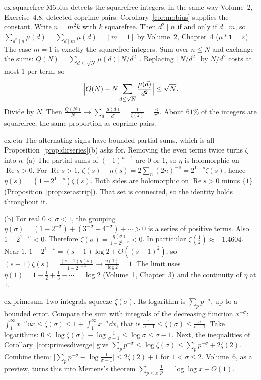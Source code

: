\begin{solution}{ex:squarefree}
\idea Möbius detects the squarefree integers, in the same way Volume~2, Exercise~4.8, detected coprime pairs. Corollary~\ref{cor:mobius} supplies the constant.
\writeup Write $n=m^2k$ with $k$ squarefree. Then $d^2\mid n$ if and only if $d\mid m$, so $\sum_{d^2\mid n}\mu(d)=\sum_{d\mid m}\mu(d)=[m=1]$ by Volume~2, Chapter~4 ($\mu*\mathbf 1=\varepsilon$). The case $m=1$ is exactly the squarefree integers.
Sum over $n\le N$ and exchange the sums: $Q(N)=\sum_{d\le\sqrt N}\mu(d)\lfloor N/d^2\rfloor$. Replacing $\lfloor N/d^2\rfloor$ by $N/d^2$ costs at most $1$ per term, so
\[
\Bigl|Q(N)-N\sum_{d\le\sqrt N}\frac{\mu(d)}{d^2}\Bigr|\le\sqrt N.
\]
Divide by $N$. Then $\frac{Q(N)}N\to\sum_d\frac{\mu(d)}{d^2}=\frac1{\zeta(2)}=\frac6{\pi^2}$. About $61\%$ of the integers are squarefree, the same proportion as coprime pairs.
\end{solution}

\begin{solution}{ex:eta}
\idea The alternating signs have bounded partial sums, which is all Proposition~\ref{prop:dirseries}(b) asks for. Removing the even terms twice turns $\zeta$ into $\eta$.
\writeup (a) The partial sums of $(-1)^{n-1}$ are $0$ or $1$, so $\eta$ is holomorphic on $\operatorname{Re}s>0$. For $\operatorname{Re}s>1$, $\zeta(s)-\eta(s)=2\sum_n(2n)^{-s}=2^{1-s}\zeta(s)$, hence $\eta(s)=(1-2^{1-s})\zeta(s)$. Both sides are holomorphic on $\operatorname{Re}s>0$ minus $\{1\}$ (Proposition~\ref{prop:zetastrip}). That set is connected, so the identity holds throughout it.

(b) For real $0<\sigma<1$, the grouping $\eta(\sigma)=(1-2^{-\sigma})+(3^{-\sigma}-4^{-\sigma})+\cdots>0$ is a series of positive terms. Also $1-2^{1-\sigma}<0$. Therefore $\zeta(\sigma)=\frac{\eta(\sigma)}{1-2^{1-\sigma}}<0$. In particular $\zeta(\frac12)\approx-1.4604$. Near $1$, $1-2^{1-s}=(s-1)\log2+O((s-1)^2)$, so $(s-1)\zeta(s)=\frac{(s-1)\eta(s)}{1-2^{1-s}}\to\frac{\eta(1)}{\log2}=1$. The limit uses $\eta(1)=1-\frac12+\frac13-\cdots=\log2$ (Volume~1, Chapter~3) and the continuity of $\eta$ at $1$.
\end{solution}

\begin{solution}{ex:primesum}
\idea Two integrals squeeze $\zeta(\sigma)$. Its logarithm is $\sum_pp^{-\sigma}$, up to a bounded error.
\writeup Compare the sum with integrals of the decreasing function $x^{-\sigma}$: $\int_1^\infty x^{-\sigma}\dd x\le\zeta(\sigma)\le1+\int_1^\infty x^{-\sigma}\dd x$, that is $\frac1{\sigma-1}\le\zeta(\sigma)\le\frac\sigma{\sigma-1}$. Take logarithms: $0\le\log\zeta(\sigma)-\log\frac1{\sigma-1}\le\log\sigma\le\sigma-1$. Next, the inequalities of Corollary~\ref{cor:primesdiverge} give $\sum_pp^{-\sigma}\le\log\zeta(\sigma)\le\sum_pp^{-\sigma}+2\zeta(2)$. Combine them: $\bigl|\sum_pp^{-\sigma}-\log\frac1{\sigma-1}\bigr|\le2\zeta(2)+1$ for $1<\sigma\le2$. Volume~6, as a preview, turns this into Mertens's theorem $\sum_{p\le x}\frac1p=\log\log x+O(1)$.
\end{solution}

